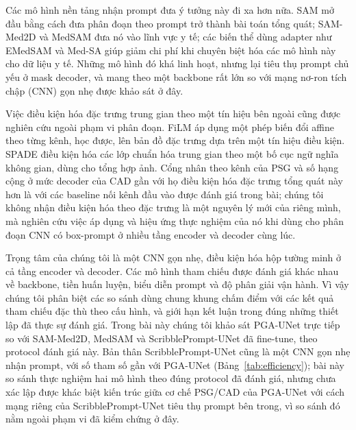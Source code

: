 \documentclass[11pt]{article}
\begin{document}
Các mô hình nền tảng nhận prompt đưa ý tưởng này đi xa hơn nữa. SAM mở đầu bằng cách đưa phân đoạn theo prompt trở thành bài toán tổng quát; SAM-Med2D và MedSAM đưa nó vào lĩnh vực y tế; các biến thể dùng adapter như EMedSAM và Med-SA giúp giảm chi phí khi chuyên biệt hóa các mô hình này cho dữ liệu y tế. Những mô hình đó khá linh hoạt, nhưng lại tiêu thụ prompt chủ yếu ở mask decoder, và mang theo một backbone rất lớn so với mạng nơ-ron tích chập (CNN) gọn nhẹ được khảo sát ở đây.

Việc điều kiện hóa đặc trưng trung gian theo một tín hiệu bên ngoài cũng được nghiên cứu ngoài phạm vi phân đoạn. FiLM áp dụng một phép biến đổi affine theo từng kênh, học được, lên bản đồ đặc trưng dựa trên một tín hiệu điều kiện. SPADE điều kiện hóa các lớp chuẩn hóa trung gian theo một bố cục ngữ nghĩa không gian, dùng cho tổng hợp ảnh. Cổng nhân theo kênh của PSG và số hạng cộng ở mức decoder của CAD gần với họ điều kiện hóa đặc trưng tổng quát này hơn là với các baseline nối kênh đầu vào được đánh giá trong bài; chúng tôi không nhận điều kiện hóa theo đặc trưng là một nguyên lý mới của riêng mình, mà nghiên cứu việc áp dụng và hiệu ứng thực nghiệm của nó khi dùng cho phân đoạn CNN có box-prompt ở nhiều tầng encoder và decoder cùng lúc.

Trọng tâm của chúng tôi là một CNN gọn nhẹ, điều kiện hóa hộp tường minh ở cả tầng encoder và decoder. Các mô hình tham chiếu được đánh giá khác nhau về backbone, tiền huấn luyện, biểu diễn prompt và độ phân giải vận hành. Vì vậy chúng tôi phân biệt các so sánh dùng chung khung chấm điểm với các kết quả tham chiếu đặc thù theo cấu hình, và giới hạn kết luận trong đúng những thiết lập đã thực sự đánh giá. Trong bài này chúng tôi khảo sát PGA-UNet trực tiếp so với SAM-Med2D, MedSAM và ScribblePrompt-UNet đã fine-tune, theo protocol đánh giá này. Bản thân ScribblePrompt-UNet cũng là một CNN gọn nhẹ nhận prompt, với số tham số gần với PGA-UNet (Bảng~\ref{tab:efficiency}); bài này so sánh thực nghiệm hai mô hình theo đúng protocol đã đánh giá, nhưng chưa xác lập được khác biệt kiến trúc giữa cơ chế PSG/CAD của PGA-UNet với cách mạng riêng của ScribblePrompt-UNet tiêu thụ prompt bên trong, vì so sánh đó nằm ngoài phạm vi đã kiểm chứng ở đây.
\end{document}
